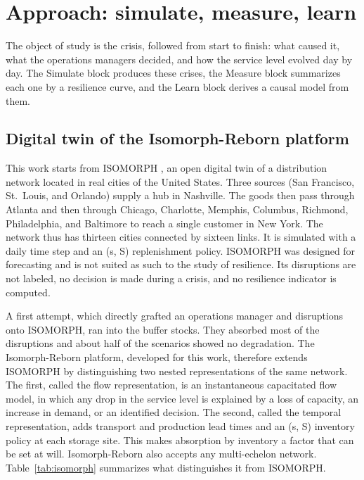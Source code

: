 \section{Approach: simulate, measure, learn}
\label{sec:3}

The object of study is the crisis, followed from start to finish: what caused it, what the operations managers decided, and how the service level evolved day by day. The Simulate block produces these crises, the Measure block summarizes each one by a resilience curve, and the Learn block derives a causal model from them.

\subsection{Digital twin of the Isomorph-Reborn platform}
\label{sec:3.1}

This work starts from ISOMORPH \citep{zhang2026isomorph}, an open digital twin of a distribution network located in real cities of the United States. Three sources (San Francisco, St.~Louis, and Orlando) supply a hub in Nashville. The goods then pass through Atlanta and then through Chicago, Charlotte, Memphis, Columbus, Richmond, Philadelphia, and Baltimore to reach a single customer in New York. The network thus has thirteen cities connected by sixteen links. It is simulated with a daily time step and an (s, S) replenishment policy. ISOMORPH was designed for forecasting and is not suited as such to the study of resilience. Its disruptions are not labeled, no decision is made during a crisis, and no resilience indicator is computed.

A first attempt, which directly grafted an operations manager and disruptions onto ISOMORPH, ran into the buffer stocks. They absorbed most of the disruptions and about half of the scenarios showed no degradation. The Isomorph-Reborn platform, developed for this work, therefore extends ISOMORPH by distinguishing two nested representations of the same network. The first, called the flow representation, is an instantaneous capacitated flow model, in which any drop in the service level is explained by a loss of capacity, an increase in demand, or an identified decision. The second, called the temporal representation, adds transport and production lead times and an (s, S) inventory policy at each storage site. This makes absorption by inventory a factor that can be set at will. Isomorph-Reborn also accepts any multi-echelon network. Table~\ref{tab:isomorph} summarizes what distinguishes it from ISOMORPH.


